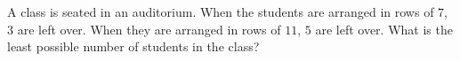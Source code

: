 A class is seated in an auditorium. When the students are arranged in rows of $7$, $3$ are left over. When they are arranged in rows of $11$, $5$ are left over. What is the least possible number of students in the class?

